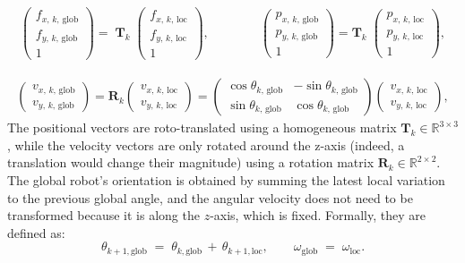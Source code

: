 \begin{align}
    \begin{pmatrix} 
        f_{x,\,k,\,\text{glob} } \\
        f_{y,\,k,\,\text{glob}} \\ 
        1 
    \end{pmatrix} = \; 
    \mathbf{T}_k \;
    \begin{pmatrix}
        f_{x,\,k,\,\text{loc} } \\
         f_{y,\,k,\,\text{loc}} \\
          1
    \end{pmatrix},\qquad \qquad
    \begin{pmatrix}
        p_{x,\,k,\,\text{glob} } \\
        p_{y,\,k,\,\text{glob}} \\[1ex]
        1
    \end{pmatrix}
    = \mathbf{T}_k \;
    \begin{pmatrix}
        p_{x,\,k,\,\text{loc} } \\
        p_{y,\,k,\,\text{loc}} \\[1ex]
        1
    \end{pmatrix},
\end{align}

\begin{align}
    \begin{pmatrix}
        v_{x,\,k,\,\text{glob} } \\[1ex]
        v_{y,\,k,\,\text{glob}}
    \end{pmatrix}
    = \mathbf{R}_k 
    \begin{pmatrix}
        v_{x,\,k,\,\text{loc} } \\[1ex]
        v_{y,\,k,\,\text{loc}}
    \end{pmatrix}
    =
    \begin{pmatrix}
        \cos\theta_{k,\, \text{glob}} & -\sin\theta_{k,\, \text{glob}} \\[1ex]
        \sin\theta_{k,\, \text{glob}} & \cos\theta_{k,\, \text{glob}}
    \end{pmatrix}
    \begin{pmatrix}
        v_{x,\,k,\,\text{loc} } \\[1ex]
        v_{y,\,k,\,\text{loc}}
    \end{pmatrix},
\end{align}
The positional vectors are roto-translated using a homogeneous matrix $ \mathbf{T}_k \in \mathbb{R}^{3\times3}$, while the velocity vectors are only rotated around the z-axis (indeed, a translation would change their magnitude) using a rotation matrix $\mathbf{R}_k \in \mathbb{R}^{2\times2}$.\\
The global robot's orientation is obtained by summing the latest local variation to the previous global angle, and the angular velocity does not need to be transformed because it is along the $z$-axis, which is fixed. Formally, they are defined as:
\begin{equation}
    \theta_{k+1, \text{glob}} \;=\; \theta_{k, \text{glob}} \,+\, \theta_{k+1, \text{loc}},
    \qquad
    \omega_{\text{glob}} \;=\; \omega_{\text{loc}}.
\end{equation}

